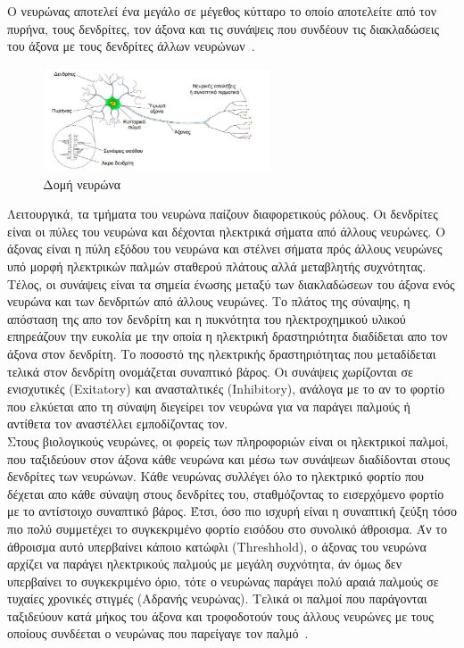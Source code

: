 \documentclass[12pt]{article}
\numberwithin{equation}{section}
\begin{document}
Ο νευρώνας αποτελεί ένα μεγάλο σε μέγεθος κύτταρο το οποίο αποτελείτε από τον πυρήνα, τους δενδρίτες, τον άξονα και τις συνάψεις που συνδέουν τις διακλαδώσεις του άξονα με τους δενδρίτες άλλων νευρώνων~\cite{zhang2019basicneuralunitsbrain}. \\

\begin{figure}[h!]
  \centering
  \includegraphics[width=0.6\textwidth]{images/neuron.png} %
  \caption{Δομή νευρώνα}
  \label{figure 9}
\end{figure}

Λειτουργικά, τα τμήματα του νευρώνα παίζουν διαφορετικούς ρόλους. Οι δενδρίτες είναι οι πύλες του νευρώνα και δέχονται ηλεκτρικά σήματα από άλλους νευρώνες. Ο άξονας είναι η πύλη εξόδου του νευρώνα και στέλνει σήματα πρός άλλους νευρώνες υπό μορφή ηλεκτρικών παλμών σταθερού πλάτους αλλά μεταβλητής συχνότητας. Τέλος, οι συνάψεις είναι τα σημεία ένωσης μεταξύ των διακλαδώσεων του άξονα ενός νευρώνα και των δενδριτών από άλλους νευρώνες. Το πλάτος της σύναψης, η απόσταση της απο τον δενδρίτη και η πυκνότητα του ηλεκτροχημικού υλικού επηρεάζουν την ευκολία με την οποία η ηλεκτρική δραστηριότητα διαδίδεται απο τον άξονα στον δενδρίτη. Το ποσοστό της ηλεκτρικής δραστηριότητας που μεταδίδεται τελικά στον δενδρίτη ονομάζεται συναπτικό βάρος. Οι συνάψεις χωρίζονται σε ενισχυτικές (Exitatory) και ανασταλτικές (Inhibitory), ανάλογα με το αν το φορτίο που ελκύεται απο τη σύναψη διεγείρει τον νευρώνα για να παράγει παλμούς ή αντίθετα τον αναστέλλει εμποδίζοντας τον. \\

Στους βιολογικούς νευρώνες, οι φορείς των πληροφοριών είναι οι ηλεκτρικοί παλμοί, που ταξιδεύουν στον άξονα κάθε νευρώνα και μέσω των συνάψεων διαδίδονται στους δενδρίτες των νευρώνων. Κάθε νευρώνας συλλέγει όλο το ηλεκτρικό φορτίο που δέχεται απο κάθε σύναψη στους δενδρίτες του, σταθμόζοντας το εισερχόμενο φορτίο με το αντίστοιχο συναπτικό βάρος. Έτσι, όσο πιο ισχυρή είναι η συναπτική ζεύξη τόσο πιο πολύ συμμετέχει το συγκεκριμένο φορτίο εισόδου στο συνολικό άθροισμα. Άν το άθροισμα αυτό υπερβαίνει κάποιο κατώφλι (Threshhold), ο άξονας του νευρώνα αρχίζει να παράγει ηλεκτρικούς παλμούς με μεγάλη συχνότητα, άν όμως δεν υπερβαίνει το συγκεκριμένο όριο, τότε ο νευρώνας παράγει πολύ αραιά παλμούς σε τυχαίες χρονικές στιγμές (Αδρανής νευρώνας). Τελικά οι παλμοί που παράγονται ταξιδεύουν κατά μήκος του άξονα και τροφοδοτούν τους άλλους νευρώνες με τους οποίους συνδέεται ο νευρώνας που παρείγαγε τον παλμό~\cite{zhang2019basicneuralunitsbrain}.
\end{document}

